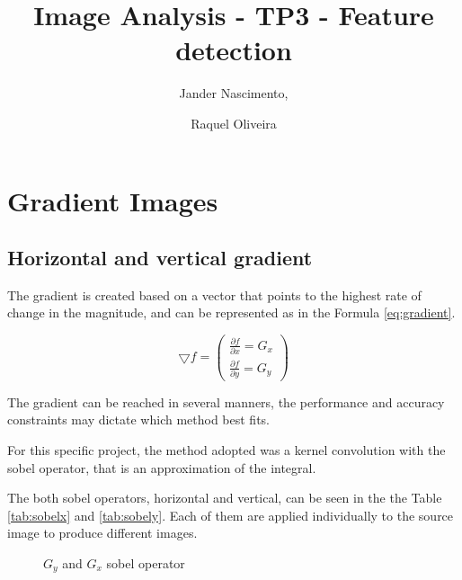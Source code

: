 \documentclass{article}
\begin{document}
\title{Image Analysis - TP3 - Feature detection}

\author{Jander Nascimento, 
\and Raquel Oliveira}

\maketitle

\section{Gradient Images}
	
	\subsection{Horizontal and vertical gradient}

	The gradient is created based on a vector that points to the highest rate of change in the magnitude, and can be represented as in the Formula \ref{eq:gradient}. 

\begin{equation}
\bigtriangledown f = \begin{pmatrix}
\frac{\partial f}{\partial x} = G_x\\ 
\frac{\partial f}{\partial y} = G_y
\end{pmatrix}
\label{eq:gradient}
\end{equation}

The gradient can be reached in several manners, the performance and accuracy constraints may dictate which method best fits. 

For this specific project, the method adopted was a kernel convolution with the sobel operator, that is an approximation of the integral. 

The both sobel operators, horizontal and vertical, can be seen in the the Table \ref{tab:sobelx} and \ref{tab:sobely}. Each of them are applied individually to the source image to produce different images.

\begin{figure}
  \begin{center}
  \end{center}
  \caption{$G_y$ and $G_x$ sobel operator}
\end{figure}
\end{document}
